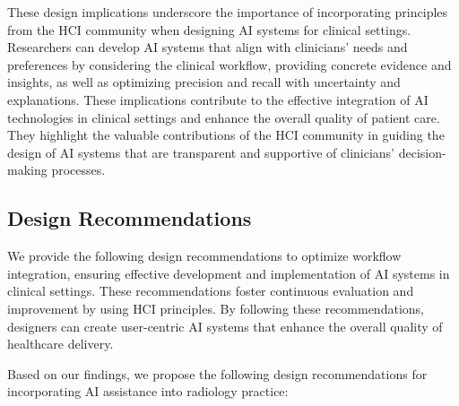\vspace{0.05mm}

These design implications underscore the importance of incorporating principles from the \ac{HCI} community when designing \ac{AI} systems for clinical settings.
Researchers can develop \ac{AI} systems that align with clinicians' needs and preferences by considering the clinical workflow, providing concrete evidence and insights, as well as optimizing precision and recall with uncertainty and explanations.
These implications contribute to the effective integration of \ac{AI} technologies in clinical settings and enhance the overall quality of patient care.
They highlight the valuable contributions of the \ac{HCI} community in guiding the design of \ac{AI} systems that are transparent and supportive of clinicians' decision-making processes.

\subsection{Design Recommendations}
\label{sec:chap005007003}

We provide the following design recommendations to optimize workflow integration, ensuring effective development and implementation of \ac{AI} systems in clinical settings.
These recommendations foster continuous evaluation and improvement by using \ac{HCI} principles.
By following these recommendations, designers can create user-centric \ac{AI} systems that enhance the overall quality of healthcare delivery.

\noindent
Based on our findings, we propose the following design recommendations for incorporating \ac{AI} assistance into radiology practice:

\vspace{0.025mm}


